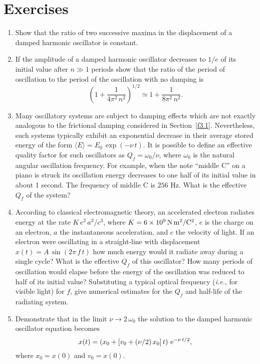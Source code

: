 \section{Exercises}
{\small
\begin{enumerate}
\item Show that the ratio of two successive maxima in the displacement of a damped
harmonic oscillator is constant.

\item If the amplitude of a damped harmonic oscillator decreases to $1/e$ of its initial
value after $n\gg 1$ periods show that the ratio of the period of oscillation to the period
of the oscillation with no damping is
$$
\left(1+\frac{1}{4\pi^2\,n^2}\right)^{1/2}\simeq 1 + \frac{1}{8\pi^2\,n^2}.
$$

\item Many oscillatory systems are subject to damping effects which are
not exactly analogous to the frictional damping considered in Section~\ref{f3.1}. 
Nevertheless, such systems typically exhibit an exponential decrease
in their average stored energy of the form $\langle E\rangle = E_0\,\exp(-\nu\,t)$. 
It is possible to define an effective quality factor for such oscillators as $Q_f=\omega_0/\nu$, where
$\omega_0$ is the natural angular oscillation frequency. For example, when the note ``middle C'' on
a piano is struck its oscillation energy decreases to one half
of its initial value in about 1 second. The frequency of middle C is $256$ Hz. What
is the effective $Q_f$ of the system?

\item According to classical electromagnetic theory, an accelerated electron
radiates energy at the rate $K\,e^2\,a^2/c^3$, where $K=6\times 10^9\,{\rm N\,m^2}/{\rm C^2}$, $e$ is the charge on an electron, $a$  the instantaneous
acceleration, and $c$ the velocity of light. If an electron were oscillating
in a straight-line with displacement $x(t)= A\,\sin(2\pi\,f\,t)$ how much energy
would it radiate away during a single cycle? What is the effective $Q_f$ of this oscillator?
How many periods of oscillation would elapse before the energy of the
oscillation was reduced to half of its initial value? Substituting a typical optical
frequency ({\em i.e.}, for visible light) for $f$, give numerical estimates 
for the $Q_f$ and half-life of the radiating system.

\item Demonstrate that in the limit $\nu\rightarrow2\,\omega_0$  the solution to the damped
harmonic oscillator equation becomes
$$
x(t) = \left(x_0 + [v_0+ (\nu/2)\,x_0]\,t\right)\,{\rm e}^{-\nu\,t/2},
$$
where $x_0=x(0)$ and $v_0=\dot{x}(0)$. 


\end{enumerate}}
